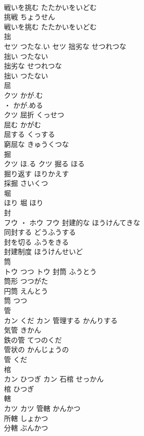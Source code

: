 \documentclass[8pt]{extreport}
\begin{document}
\begin{CJK}{UTF8}{min}
\\	戦いを挑む	たたかいをいどむ	
\\	挑戦	ちょうせん	
\\	戦いを挑む	たたかいをいどむ	
\\	拙	
\\	セツ	つたな.い	セツ	拙劣な	せつれつな	
\\	拙い	つたない	
\\	拙劣な	せつれつな	
\\	拙い	つたない	
\\	屈	
\\	クツ	かが.む
\\	・ かが.める
\\	クツ	屈折	くっせつ	
\\	屈む	かがむ	
\\	屈する	くっする	
\\	窮屈な	きゅうくつな	
\\	掘	
\\	クツ	ほ.る	クツ	掘る	ほる	
\\	掘り返す	ほりかえす	
\\	採掘	さいくつ	
\\	堀	
\\	ほり														堀	ほり	
\\	封	
\\	フウ ・ ホウ		フウ	封建的な	ほうけんてきな	
\\	同封する	どうふうする	
\\	封を切る	ふうをきる	
\\	封建制度	ほうけんせいど	
\\	筒	
\\	トウ	つつ	トウ	封筒	ふうとう	
\\	筒形	つつがた	
\\	円筒	えんとう	
\\	筒	つつ	
\\	管	
\\	カン	くだ	カン	管理する	かんりする	
\\	気管	きかん	
\\	鉄の管	てつのくだ	
\\	管状の	かんじょうの	
\\	管	くだ	
\\	棺	
\\	カン	ひつぎ	カン	石棺	せっかん	
\\	棺	ひつぎ	
\\	轄	
\\	カツ		カツ	管轄	かんかつ	
\\	所轄	しょかつ	
\\	分轄	ぶんかつ	

\end{CJK}
\end{document}

